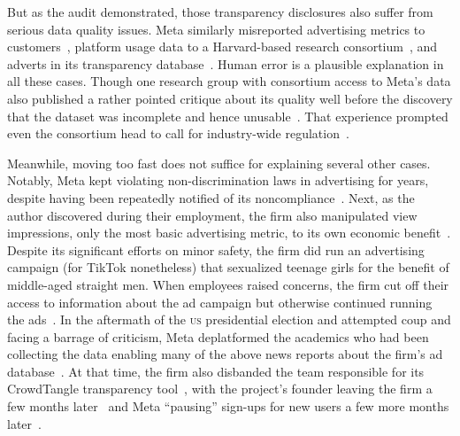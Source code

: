 \documentclass[nonacm,screen]{acmart}
\newcommand\V[1]{\textsc{\MakeLowercase{#1}}}
\begin{document}
\begin{itemize}
{But as the audit demonstrated, those transparency disclosures also suffer from
serious data quality issues. Meta similarly misreported advertising metrics to
customers~\cite{BruellPatel2020,Hutchinson2016,Hutchinson2016b,Hutchinson2017,
VranicaMarshall2016}, platform usage data to a Harvard-based research
consortium~\cite{Timberg2021}, and adverts in its transparency
database~\cite{Rosenberg2019,ScottMontellaro2021,SilvermanMac2020a}. Human error
is a plausible explanation in all these cases. Though one research group with
consortium access to Meta's data also published a rather pointed critique about
its quality well before the discovery that the dataset was incomplete and hence
unusable~\cite{Hegelich2020,HegelichMarcoea2020}. That experience prompted even
the consortium head to call for industry-wide
regulation~\cite{PersilyTucker2021}.

Meanwhile, moving too fast does not suffice for explaining several other cases.
Notably, Meta kept violating non-discrimination laws in advertising for years,
despite having been repeatedly notified of its
noncompliance~\cite{AngwinParrisJr2016,AngwinScheiberea2017,AngwinTobinea2017,
KofmanTobin2019,Kofman2022,Merrill2020,TobinMerrill2018}. Next, as the author
discovered during their employment, the firm also manipulated view impressions,
only the most basic advertising metric, to its own economic
benefit~\cite{Grimm2022c}. Despite its significant efforts on minor safety, the
firm did run an advertising campaign (for TikTok nonetheless) that sexualized
teenage girls for the benefit of middle-aged straight men. When employees raised
concerns, the firm cut off their access to information about the ad campaign but
otherwise continued running the ads~\cite{SilvermanMac2020}. In the aftermath of
the \V{US} presidential election and attempted coup and facing a barrage of
criticism, Meta deplatformed the academics who had been collecting the data
enabling many of the above news reports about the firm's ad
database~\cite{EdelsonMcCoy2021, EdelsonMcCoy2021a}. At that time, the firm also
disbanded the team responsible for its CrowdTangle transparency
tool~\cite{Roose2021a}, with the project's founder leaving the firm a few months
later~\cite{Heath2021} and Meta ``pausing'' sign-ups for new users a few more
months later~\cite{PatelCulliford2022}.

}
\end{itemize}
\end{document}
